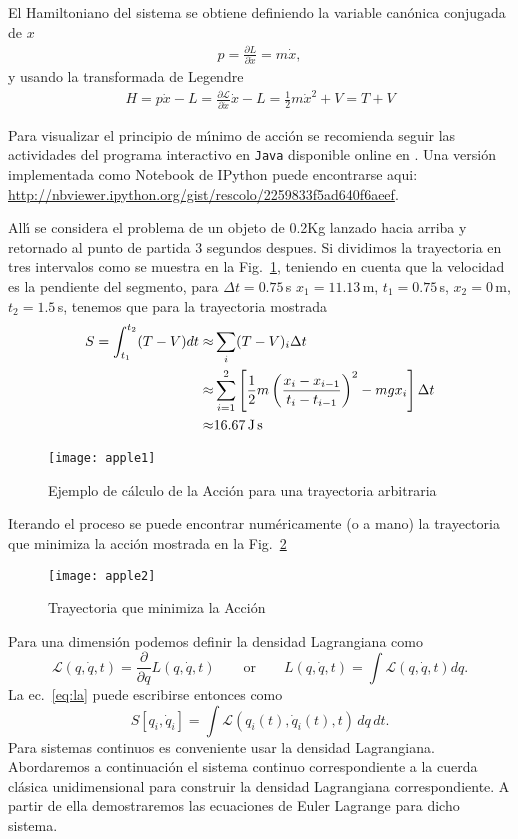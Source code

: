 El Hamiltoniano del sistema se obtiene definiendo la variable can\'onica conjugada de $x$
\begin{align}
  p=\frac{\partial L}{\partial\dot{x}}=m \dot{x},
\end{align}
y usando la transformada de Legendre
\begin{align}
  H=p \dot{x}-L=\frac{\partial\mathcal{L}}{\partial\dot{x}}\dot{x}-L=\frac{1}{2}m\dot{x}^2+V=T+V
\end{align}

Para visualizar el principio de m\'\i nimo de acci\'on se recomienda seguir las actividades del programa interactivo en \texttt{Java} disponible online en \cite{JavaAP}. 
Una versión implementada como Notebook de IPython puede encontrarse aqui: \url{http://nbviewer.ipython.org/gist/rescolo/2259833f5ad640f6aeef}.

All\'\i{} se considera el problema de un objeto de 0.2Kg lanzado hacia arriba y retornado al punto de partida 3 segundos despues. Si dividimos la trayectoria en tres intervalos como se muestra en la Fig.~\ref{fig:apple1}, teniendo en cuenta que la velocidad es la pendiente del segmento, para $\Delta t=0.75\,$s $x_1=11.13\,$m, $t_1=0.75\,$s, $x_2=0\,$m, $t_2=1.5\,$s, tenemos que para la trayectoria mostrada
\begin{align}
  S=\int_{t_1}^{t_2}(T-V)dt\approx&\sum_i(T-V)_i\Delta t\nonumber\\
  \approx&\sum_{i=1}^2\left[\frac{1}{2}m\left(\frac{x_i-x_{i-1}}{t_i-t_{i-1}}\right)^2-m g x_i\right]\Delta t\nonumber\\
  \approx&16.67\,\text{J\,s}
\end{align}
\begin{figure}
  \centering
  \texttt{[image: apple1]}
  \caption{Ejemplo de c\'alculo de la Acci\'on para una trayectoria arbitraria}
  \label{fig:apple1}
\end{figure}
Iterando el proceso se puede encontrar num\'ericamente (o a mano) la trayectoria que minimiza la acci\'on mostrada en la Fig.~\ref{fig:apple2}
\begin{figure}
  \centering
\texttt{[image: apple2]}
  \caption{Trayectoria que minimiza la Acci\'on}
\label{fig:apple2}
\end{figure}
Para una dimensi\'on podemos definir la densidad Lagrangiana como
\begin{equation}
  \mathcal{L}(q,\dot q,t)=\frac{\partial}{\partial q}L(q,\dot q,t)\qquad\text{or}\qquad L(q,\dot q,t)=\int\mathcal{L}(q,\dot q,t)dq.
\end{equation}
La ec.~\eqref{eq:la} puede escribirse entonces como
\begin{equation}
   S\left[q_i,\dot{q}_i\right] = \int \mathcal{L}(q_i(t), \dot{q}_i(t),t)\, dq\,dt.
\end{equation}
Para sistemas continuos es conveniente usar la densidad Lagrangiana. Abordaremos a continuaci\'on el sistema continuo correspondiente a la cuerda cl\'asica unidimensional para construir la densidad Lagrangiana correspondiente. A partir de ella demostraremos las ecuaciones de Euler Lagrange para dicho sistema.

